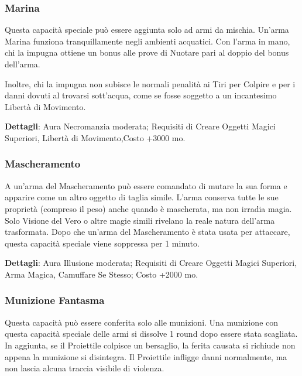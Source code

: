 \begin{multicols}{2}
	\subsubsection*{Marina}

	Questa capacità speciale può essere aggiunta solo ad armi da mischia. Un'arma Marina funziona tranquillamente negli ambienti acquatici. Con l'arma in mano, chi la impugna ottiene un bonus alle prove di Nuotare pari al doppio del bonus dell'arma.

	Inoltre, chi la impugna non subisce le normali penalità ai Tiri per Colpire e per i danni dovuti al trovarsi sott'acqua, come se fosse soggetto a un incantesimo Libertà di Movimento.

	\textbf{Dettagli}: Aura Necromanzia moderata; Requisiti di Creare Oggetti Magici Superiori, Libertà di Movimento,Costo +3000 mo.

	\subsubsection*{Mascheramento}

	A un'arma del Mascheramento può essere comandato di mutare la sua forma e apparire come un altro oggetto di taglia simile. L'arma conserva tutte le sue proprietà (compreso il peso) anche quando è mascherata, ma non irradia magia. Solo Visione del Vero o altre magie simili rivelano la reale natura dell'arma trasformata. Dopo che un'arma del Mascheramento è stata usata per attaccare, questa capacità speciale viene soppressa per 1 minuto.

	\textbf{Dettagli}: Aura Illusione moderata; Requisiti di Creare Oggetti Magici Superiori, Arma Magica, Camuffare Se Stesso; Costo +2000 mo.

	\subsubsection*{Munizione Fantasma}

	Questa capacità può essere conferita solo alle munizioni. Una munizione con questa capacità speciale delle armi si dissolve 1 round dopo essere stata scagliata. In aggiunta, se il Proiettile colpisce un bersaglio, la ferita causata si richiude non appena la munizione si disintegra. Il Proiettile infligge danni normalmente, ma non lascia alcuna traccia visibile di violenza.


\end{multicols}
